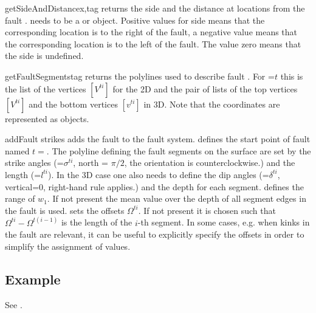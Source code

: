 \begin{methoddesc}[FaultSystem]{getSideAndDistance}{x,tag}
returns the side and the distance at locations  from the fault .
 needs to be a \Vector or \numpyNDA object.
Positive values for side means that the corresponding location is to the right
of the fault, a negative value means that the corresponding location is
to the left of the fault. The value zero means that the side is undefined.
\end{methoddesc}

\begin{methoddesc}[FaultSystem]{getFaultSegments}{tag}
returns the polylines used to describe fault . For =$t$ this
is the list of the vertices $[V^{ti}]$ for the 2D and the pair of lists of the
top vertices $[V^{ti}]$ and the bottom vertices $[v^{ti}]$ in 3D.
Note that the coordinates are represented as \numpyNDA objects.
\end{methoddesc}

\begin{methoddesc}[FaultSystem]{addFault}{
strikes}
adds the fault  to the fault system.
 defines the start point of fault named $t=$.
The polyline defining the fault segments on the surface are set by the strike
angles  (=$\sigma^{ti}$, north = $\pi/2$, the orientation is
counterclockwise.) and the length  (=$l^{ti}$).
In the 3D case one also needs to define the dip angles 
(=$\delta^{ti}$, vertical=$0$, right-hand rule applies.) and the depth
 for each segment.
 defines the range of $w_{1}$.
If not present the mean value over the depth of all segment edges in the fault
is used.
 sets the offsets $\Omega^{ti}$. If not present it is chosen
such that $\Omega^{ti}-\Omega^{t(i-1)}$ is the length of the $i$-th segment.
In some cases, e.g. when kinks in the fault are relevant, it can be useful
to explicitly specify the offsets in order to simplify the assignment of values.
\end{methoddesc}

\subsection{Example}
See .

